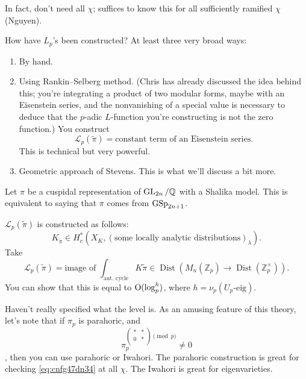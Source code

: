 \documentclass[reqno]{amsart} 
\begin{document}
In fact, don't need all $\chi$; suffices to know this for all sufficiently ramified $\chi$ (Nguyen).

How have $L_p$'s been constructed?  At least three very broad ways:
\begin{enumerate}
\item By hand.
\item Using Rankin--Selberg method.  (Chris has already discussed the idea behind this; you're integrating a product of two modular forms, maybe with an Eisenstein series, and the nonvanishing of a special value is necessary to deduce that the $p$-adic $L$-function you're constructing is not the zero function.)  You construct
  \begin{equation*}
    \mathcal{L}_p(\tilde{\pi}) = \text{constant term of an Eisenstein series}.
  \end{equation*}
  This is technical but very powerful.
\item Geometric approach of Stevens.  This is what we'll discuss a bit more.
\end{enumerate}

Let $\pi$ be a cuspidal representation of $\operatorname{GL}_{2 n}/\mathbb{Q}$ with a Shalika model.  This is equivalent to saying that $\pi$ comes from $\operatorname{GSp}_{2 n + 1}$.

$\mathcal{L}_p(\tilde{\pi})$ is constructed as follows:
\begin{equation*}
  K_{\tilde{\pi}} \in H_c^\ast(X_K, (\text{some locally analytic distributions})_\lambda).
\end{equation*}
Take
\begin{equation*}
  \mathcal{L}_p(\tilde{\pi}) = \text{image of }
  \int_{\text{aut. cycle}} K \tilde{\pi} \in
  \operatorname{Dist}(M_n(\mathbb{Z}_p) \rightarrow \operatorname{Dist}(\mathbb{Z}_p^\times)).
\end{equation*}
You can show that this is equal to $\operatorname{O}(\log_p^h)$, where $h = \nu_p(U_p\text{-eig})$.

Haven't really specified what the level is.  As an amusing feature of this theory, let's note that if $\pi_p$ is parahoric, and
\begin{equation*}
  \pi_p^{
    \begin{pmatrix}
      \ast      & \ast \\
      0 & \ast \\
    \end{pmatrix} \pmod{p}}
  \neq 0
\end{equation*},
then you can use parahoric or Iwahori.  The parahoric construction is great for checking \eqref{eq:cnfg47dn34} at all $\chi$.  The Iwahori is great for eigenvarieties.
\end{document}
